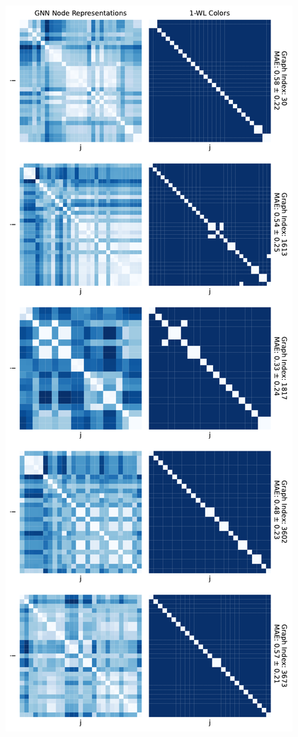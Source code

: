 \begin{figure}[!ht]
\begin{minipage}[b]{0.45992852703\textwidth}
        \includegraphics[width=\textwidth, left]{Figures/heatmaps_NCI1_0.pdf}

\end{minipage}
\end{figure}
